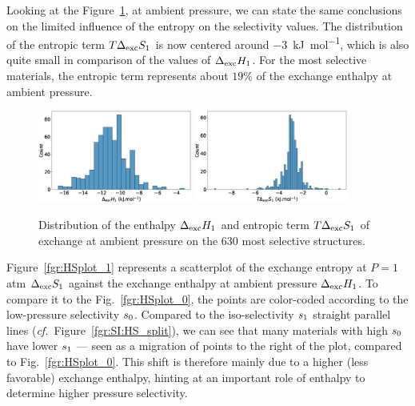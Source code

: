 \documentclass[main.tex]{subfiles}
\begin{document}
Looking at the Figure~\ref{fgr:SI:dist1}, at ambient pressure, we can state the same conclusions on the limited influence of the entropy on the selectivity values. The distribution of the entropic term $T\Delta_{\text{exc}}S_{\text{1}}$ is now centered around $-3$~\si{\kilo\joule\per\mole}, which is also quite small in comparison of the values of $\Delta_{\text{exc}}H_{\text{1}}$. For the most selective materials, the entropic term represents about {$19$\%} of the exchange enthalpy at ambient pressure.

\begin{figure}[h]
  \centering
    \includegraphics[width=0.45\textwidth]{figures/2-thermo/Delta_H_2080.jpg}
    \includegraphics[width=0.45\textwidth]{figures/2-thermo/T_Delta_S_2080.jpg}
    \caption{Distribution of the enthalpy $\Delta_{\text{exc}}H_{\text{1}}$ and entropic term $T\Delta_{\text{exc}}S_{\text{1}}$ of exchange at ambient pressure on the 630 most selective structures.}\label{fgr:SI:dist1}
\end{figure}

Figure~\ref{fgr:HSplot_1} represents a scatterplot of the exchange entropy at $P = 1$\,atm $\Delta_{\text{exc}}S_{\text{1}}$ against the exchange enthalpy at ambient pressure $\Delta_{\text{exc}}H_{\text{1}}$. To compare it to the Fig.~\ref{fgr:HSplot_0}, the points are color-coded according to the low-pressure selectivity $s_{\text{0}}$. Compared to the iso-selectivity $s_{\text{1}}$ straight parallel lines (\emph{cf.}~Figure~\ref{fgr:SI:HS_split}), we can see that many materials with high $s_{\text{0}}$ have lower $s_{\text{1}}$ --- seen as a migration of points to the right of the plot, compared to Fig.~\ref{fgr:HSplot_0}. This shift is therefore mainly due to a higher (less favorable) exchange enthalpy, hinting at an important role of enthalpy to determine higher pressure selectivity.
\end{document}
